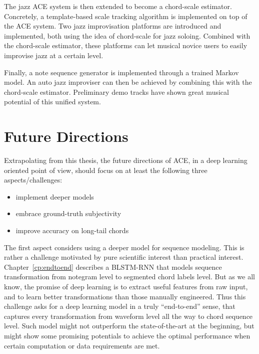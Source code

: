 The jazz ACE system is then extended to become a chord-scale estimator. Concretely, a template-based scale tracking algorithm is implemented on top of the ACE system. Two jazz improvisation platforms are introduced and implemented, both using the idea of chord-scale for jazz soloing. Combined with the chord-scale estimator, these platforms can let musical novice users to easily improvise jazz at a certain level.

Finally, a note sequence generator is implemented through a trained Markov model. An auto jazz improviser can then be achieved by combining this with the chord-scale estimator. Preliminary demo tracks have shown great musical potential of this unified system.

\section{Future Directions} \label{sec:6-future}


Extrapolating from this thesis, the future directions of ACE, in a deep learning oriented point of view, should focus on at least the following three aspects/challenges:
\begin{itemize}
\item implement deeper models
\item embrace ground-truth subjectivity
\item improve accuracy on long-tail chords
\end{itemize}

The first aspect considers using a deeper model for sequence modeling. This is rather a challenge motivated by pure scientific interest than practical interest. Chapter~\ref{cp:endtoend} describes a BLSTM-RNN that models sequence transformation from notegram level to segmented chord labels level. But as we all know, the promise of deep learning is to extract useful features from raw input, and to learn better transformations than those manually engineered. Thus this challenge asks for a deep learning model in a truly ``end-to-end'' sense, that captures every transformation from waveform level all the way to chord sequence level. Such model might not outperform the state-of-the-art at the beginning, but might show some promising potentials to achieve the optimal performance when certain computation or data requirements are met.

